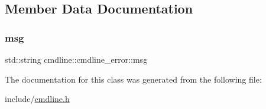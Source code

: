\subsection{Member Data Documentation}
\mbox{\label{classcmdline_1_1cmdline__error_a46964bd9b018c935fe498a91703183fc}} 
\subsubsection{\texorpdfstring{msg}{msg}}
{\footnotesize\ttfamily std\+::string cmdline\+::cmdline\+\_\+error\+::msg\hspace{0.3cm}{\ttfamily [private]}}



The documentation for this class was generated from the following file\+:\begin{DoxyCompactItemize}
\item 
include/\mbox{\hyperlink{cmdline_8h}{cmdline.\+h}}\end{DoxyCompactItemize}
